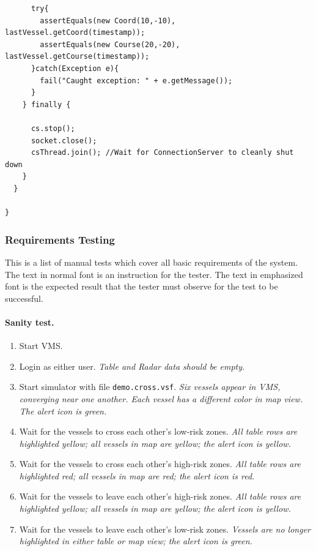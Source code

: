 \documentclass{article}
\begin{document}
\begin{verbatim}
      try{
        assertEquals(new Coord(10,-10), lastVessel.getCoord(timestamp));
        assertEquals(new Course(20,-20), lastVessel.getCourse(timestamp));
      }catch(Exception e){
        fail("Caught exception: " + e.getMessage());
      }
    } finally {

      cs.stop();
      socket.close();
      csThread.join(); //Wait for ConnectionServer to cleanly shut down
    }
  }

}
\end{verbatim}
\linespread{1.6}

\subsubsection{Requirements Testing}


This is a list of manual tests which cover all basic requirements of the system. The text in normal font is an instruction for the tester. The text in emphasized font is the expected result that the tester must observe for the test to be successful.

\paragraph{Sanity test.}

\begin{enumerate}
\item Start VMS.
\item Login as either user. \emph{Table and Radar data should be empty.}
\item Start simulator with file \verb|demo.cross.vsf|. \emph{Six vessels appear in VMS, converging near one another. Each vessel has a different color in map view. The alert icon is green.}
\item Wait for the vessels to cross each other's low-risk zones. \emph{All table rows are highlighted yellow; all vessels in map are yellow; the alert icon is yellow.}
\item Wait for the vessels to cross each other's high-risk zones. \emph{All table rows are highlighted red; all vessels in map are red; the alert icon is red.}
\item Wait for the vessels to leave each other's high-risk zones. \emph{All table rows are highlighted yellow; all vessels in map are yellow; the alert icon is yellow.}
\item Wait for the vessels to leave each other's low-risk zones. \emph{Vessels are no longer highlighted in either table or map view; the alert icon is green.}
\end{enumerate}
\end{document}
